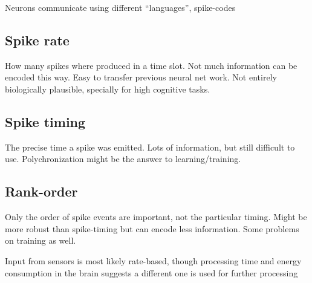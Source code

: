 Neurons communicate using different ``languages'', spike-codes

\subsection{Spike rate}
How many spikes where produced in a time slot. Not much information can be encoded this way. Easy to transfer previous neural net work. Not entirely biologically plausible, specially for high cognitive tasks.

\subsection{Spike timing}
The precise time a spike was emitted. Lots of information, but still difficult to use. Polychronization might be the answer to learning/training.

\subsection{Rank-order}
Only the order of spike events are important, not the particular timing. Might be more robust than spike-timing but can encode less information. Some problems on training as well.

Input from sensors is most likely rate-based, though processing time and energy consumption in the brain suggests a different one is used for further processing